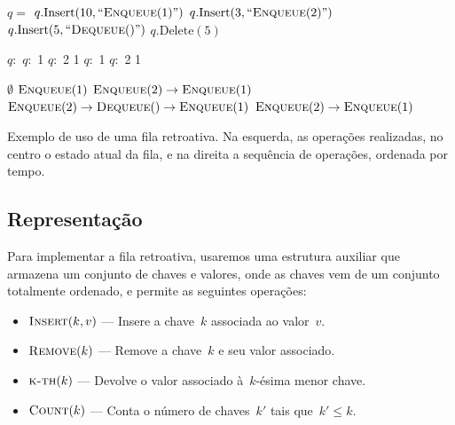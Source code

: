 \documentclass[quali.tex]{subfile}
\begin{document}
\begin{table}
\centering

\begin{subalgorithm}{0.34\textwidth}
\begin{algorithmic}

	\State $q =$ 
	\State $q.\text{Insert}(10, ``\Call{Enqueue}{1}")$
	\State $q.\text{Insert}(3, ``\Call{Enqueue}{2}")$
	\State $q.\text{Insert}(5, ``\Call{Dequeue}{\null}")$
	\State $q.\text{Delete}(5)$

\end{algorithmic}
\end{subalgorithm} \vrule
\begin{subalgorithm}{0.14\textwidth}
\begin{algorithmic}

	\State $q:$
	\State $q:$ 1
	\State $q:$ 2 1
	\State $q:$ 1
	\State $q:$ 2 1

\end{algorithmic}
\end{subalgorithm} \vrule
\begin{subalgorithm}{0.5\textwidth}
\begin{algorithmic}

	\State $\emptyset$
	\State $\Call{Enqueue}{1}$
	\State $\Call{Enqueue}{2} \rightarrow \Call{Enqueue}{1}$
	\State $\Call{Enqueue}{2} \rightarrow \Call{Dequeue}{\null} \rightarrow \Call{Enqueue}{1}$
	\State $\Call{Enqueue}{2} \rightarrow \Call{Enqueue}{1}$

\end{algorithmic}
\end{subalgorithm}
\caption{Exemplo de uso de uma fila retroativa. Na esquerda, as operações realizadas, no centro o estado atual da fila, e na direita a sequência de operações, ordenada por tempo.} \label{ex:fila_retro}
\end{table}

\subsection{Representação}

Para implementar a fila retroativa, usaremos uma estrutura auxiliar que armazena um conjunto de chaves e valores, onde as chaves vem de um conjunto totalmente ordenado, e permite as seguintes operações:

\begin{itemize}
	\item $\Call{Insert}{k, v}$ --- Insere a chave~$k$ associada ao valor~$v$.
	\item $\Call{Remove}{k}$ --- Remove a chave~$k$ e seu valor associado.
	\item $\Call{k-th}{k}$ --- Devolve o valor associado à~$k$-ésima menor chave. %
	\item $\Call{Count}{k}$ --- Conta o número de chaves~$k'$ tais que~$k' \leq k$.
\end{itemize}
\end{document}
